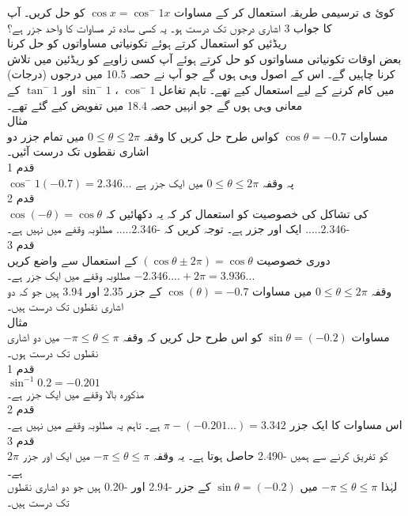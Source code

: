 کوئ
ی ترسیمی طریقہ استعمال کر کے مساوات
\(\cos x=\cos^-1 x \) 
کو حل کریں۔ آپ کا جواب 3 اشاری درجوں تک درست ہو۔ یہ کسی سادہ تر مساوات کا واحد جزر ہے؟\\
ریڈئیں کو استعمال کرتے ہوئے تکونیاتی مساواتوں کو حل کرنا\\
بعض اوقات تکونیاتی مساواتوں کو حل کرتے ہوئے آپ کسی زاویے کو ریڈئین میں تلاش کرنا چاہیں گے۔ اس کے اصول وہی ہوں گے جو آپ نے حصہ 10.5 میں درجوں (درجات) میں کام کرنے کے لیے استعمال کیے تھے۔ تاہم تغاعل 
\(\cos^-1\)
، 
\(\sin^-1 \)
اور
\(\tan^-1 \)
کے معانی وہی ہوں گے جو انہیں حصہ 18.4 میں تفویض کیے گئے تھے۔\\ 
مثال \\
مساوات 
\(\cos\theta=-0.7 \) 
کواس طرح حل کریں کا وقفہ
\(0 \le\theta \le 2\pi\) 
میں تمام جزر دو اشاری نقطوں تک درست آئیں۔\\ 
قدم 1\\
\(\cos^-1 (-0.7)=2.346...\) 
پہ وقفہ
\(0\le\theta \le2\pi\)
میں ایک جزر ہے \\
قدم 2\\
\(\cos(-\theta)=\cos\theta\) 
کی تشاکل کی خصوصیت کو استعمال کر کہ یہ دکھائیں کہ
-2.346..... 
ایک اور جزر ہے۔ توجہ کریں کہ
-2.346..... 
مطلوبہ وقفے میں نہیں ہے۔ \\
قدم 3\\
دوری خصوصيت 
\((\cos{\theta\pm 2\pi})=\cos{\theta}\)
کے استعمال سے واضع کریں
\(-2.346....+2\pi=3.936...\)
مطلوبہ وقفے میں ایک جزر ہے۔\\ 
وقفہ 
\(0\le\theta \le2\pi\) 
میں مساوات 
\(\cos(\theta)=-0.7\)    
کے جزر 2.35 اور 3.94 ہیں جو کہ دو اشاری نقطوں تک درست ہیں۔ \\
مثال \\
مساوات
\(\sin\theta=(-0.2) \) 
کو اس طرح حل کریں کہ وقفہ
\(-\pi \le\theta \le \pi\) 
میں دو اشاری نقطوں تک درست ہوں۔ \\
قدم 1\\
\(\sin^{-1}{0.2}=-0.201\)\\
مذکورہ بالا  وقفے میں ایک جزر ہے۔ \\
قدم 2\\
اس مساوات کا ایک جزر 
\(\pi-(-0.201\dotsc)=3.342\)
ہے۔ تاہم یہ مطلوبہ وقفے میں نہیں ہے۔\\ 
قدم 3\\
\(2\pi\)
کو تفریق کرنے سے ہمیں
-2.490
حاصل ہوتا ہے۔ یہ وقفہ
\(-\pi \le\theta \le \pi\)
میں ایک اور جزر ہے۔\\ 
لہٰذا 
\(-\pi \le\theta \le \pi\)
میں 
\(\sin\theta=(-0.2) \)
کے جزر
-2.94
اور
-0.20
ہیں جو دو اشاری نقطوں تک درست ہیں۔\\ 
